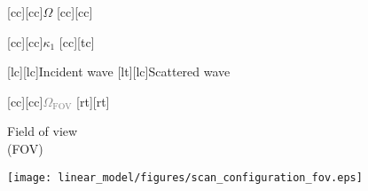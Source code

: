 [cc][cc]{\footnotesize $\Omega$}
[cc][cc]{}

[cc][cc]{\footnotesize $\kappa_{1}$}
[cc][tc]{}

[lc][lc]{\footnotesize Incident wave}
[lt][lc]{\footnotesize Scattered wave}

[cc][cc]{\footnotesize \textcolor{gray}{$\Omega_{\text{FOV}}$}}
[rt][rt]{\footnotesize \parbox[t]{2.75cm}{\raggedleft Field of view\\(\acs{FOV})}}

\texttt{[image: linear\_model/figures/scan\_configuration\_fov.eps]}
